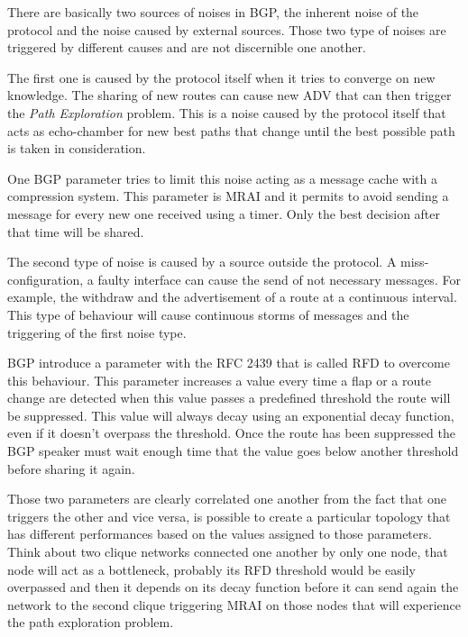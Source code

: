 There are basically two sources of noises in \ac{BGP}, the inherent noise of
the protocol and the noise caused by external sources.
Those two type of noises are triggered by different causes and are
not discernible one another.

The first one is caused by the protocol itself when it tries to converge
on new knowledge.
The sharing of new routes can cause new \ac{ADV} that can then trigger the
\textit{Path Exploration} problem.
This is a noise caused by the protocol itself that acts as echo-chamber for
new best paths that change until the best possible path is taken in consideration.

One \ac{BGP} parameter tries to limit this noise acting as a message cache with
a compression system.
This parameter is \ac{MRAI} and it permits to avoid sending a message for every
new one received using a timer.
Only the best decision after that time will be shared.

The second type of noise is caused by a source outside the protocol.
A miss-configuration, a faulty interface can cause the send of not necessary messages.
For example, the withdraw and the advertisement of a route at a continuous interval.
This type of behaviour will cause continuous storms of messages and the triggering
of the first noise type.

\ac{BGP} introduce a parameter with the \ac{RFC} \num{2439} \cite{rfc2439} that
is called \ac{RFD} to overcome this behaviour.
This parameter increases a value every time a flap or a route change are detected
when this value passes a predefined threshold the route will be suppressed.
This value will always decay using an exponential decay function, even if it
doesn't overpass the threshold.
Once the route has been suppressed the \ac{BGP} speaker must wait enough time
that the value goes below another threshold before sharing it again.

Those two parameters are clearly correlated one another from the fact that
one triggers the other and vice versa, is possible to create a particular topology
that has different performances based on the values assigned to those
parameters.
Think about two clique networks connected one another by only one node, that
node will act as a bottleneck, probably its \ac{RFD} threshold would be easily
overpassed and then it depends on its decay function before it can send
again the network to the second clique triggering \ac{MRAI} on those nodes that
will experience the path exploration problem.


